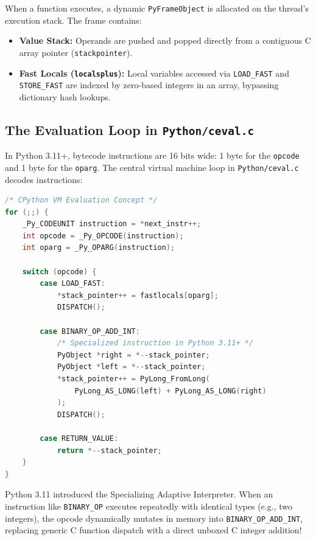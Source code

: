 When a function executes, a dynamic \texttt{PyFrameObject} is allocated on the thread's execution stack. The frame contains:
\begin{itemize}[leftmargin=15pt]
  \item \textbf{Value Stack:} Operands are pushed and popped directly from a contiguous C array pointer (\texttt{stackpointer}).
  \item \textbf{Fast Locals (\texttt{localsplus}):} Local variables accessed via \texttt{LOAD\_FAST} and \texttt{STORE\_FAST} are indexed by zero-based integers in an array, bypassing dictionary hash lookups.
\end{itemize}

\subsection{The Evaluation Loop in \texttt{Python/ceval.c}}

In Python 3.11+, bytecode instructions are 16 bits wide: 1 byte for the \texttt{opcode} and 1 byte for the \texttt{oparg}. The central virtual machine loop in \texttt{Python/ceval.c} decodes instructions:

\begin{lstlisting}[language=C,caption={Simplified CPython Opcode Dispatch Loop}]
/* CPython VM Evaluation Concept */
for (;;) {
    _Py_CODEUNIT instruction = *next_instr++;
    int opcode = _Py_OPCODE(instruction);
    int oparg = _Py_OPARG(instruction);

    switch (opcode) {
        case LOAD_FAST:
            *stack_pointer++ = fastlocals[oparg];
            DISPATCH();

        case BINARY_OP_ADD_INT:
            /* Specialized instruction in Python 3.11+ */
            PyObject *right = *--stack_pointer;
            PyObject *left = *--stack_pointer;
            *stack_pointer++ = PyLong_FromLong(
                PyLong_AS_LONG(left) + PyLong_AS_LONG(right)
            );
            DISPATCH();
            
        case RETURN_VALUE:
            return *--stack_pointer;
    }
}
\end{lstlisting}

\begin{underthehoodbox}
Python 3.11 introduced the Specializing Adaptive Interpreter. When an instruction like \texttt{BINARY\_OP} executes repeatedly with identical types (e.g., two integers), the opcode dynamically mutates in memory into \texttt{BINARY\_OP\_ADD\_INT}, replacing generic C function dispatch with a direct unboxed C integer addition!
\end{underthehoodbox}

